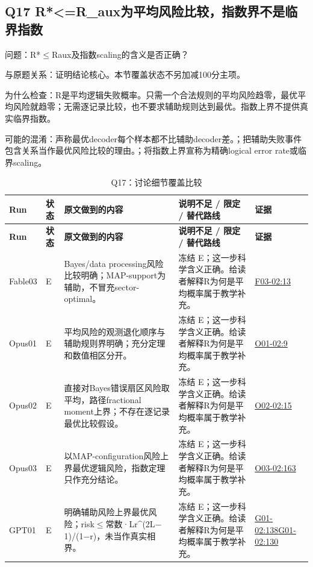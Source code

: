 \documentclass[11pt,a4paper]{article}
\begin{document}
\clearpage
\subsection{Q17 R*<=R\_aux为平均风险比较，指数界不是临界指数}
\label{aspect:Q17}
问题：R*\ensuremath{\leq}Raux及指数scaling的含义是否正确？

与原题关系：证明结论核心。本节覆盖状态不另加减100分主项。

为什么检查：R是平均逻辑失败概率。只需一个合法规则的平均风险趋零，最优平均风险就趋零；无需逐记录比较，也不要求辅助规则达到最优。指数上界不提供真实临界指数。

可能的混淆：声称最优decoder每个样本都不比辅助decoder差。；把辅助失败事件包含关系当作最优风险比较的理由。；将指数上界宣称为精确logical error rate或临界scaling。

{\fontsize{9.0}{12.6}\selectfont
\setlength{\tabcolsep}{2.5pt}
\begin{longtable}{>{\raggedright\arraybackslash}p{}>{\raggedright\arraybackslash}p{}>{\raggedright\arraybackslash}p{}>{\raggedright\arraybackslash}p{}>{\raggedright\arraybackslash}p{}}
\caption{Q17：讨论细节覆盖比较}\\
\toprule
\textbf{Run} & \textbf{状态} & \textbf{原文做到的内容} & \textbf{说明不足 / 限定 / 替代路线} & \textbf{证据}\tabularnewline
\midrule
\endfirsthead
\toprule
\textbf{Run} & \textbf{状态} & \textbf{原文做到的内容} & \textbf{说明不足 / 限定 / 替代路线} & \textbf{证据}\tabularnewline
\midrule
\endhead
{}Fable03 & E & Bayes/data processing风险比较明确；MAP-support为辅助，不冒充sector-optimal。 & 冻结 E；这一步科学含义正确。给读者解释R为何是平均概率属于教学补充。 & \hyperref[src:F03-02]{F03-02:13}\tabularnewline
{}Opus01 & E & 平均风险的观测退化顺序与辅助规则界明确；充分定理和数值相区分开。 & 冻结 E；这一步科学含义正确。给读者解释R为何是平均概率属于教学补充。 & \hyperref[src:O01-02]{O01-02:9}\tabularnewline
{}Opus02 & E & 直接对Bayes错误扇区风险取平均，路径fractional moment上界；不存在逐记录最优比较假设。 & 冻结 E；这一步科学含义正确。给读者解释R为何是平均概率属于教学补充。 & \hyperref[src:O02-02]{O02-02:15}\tabularnewline
{}Opus03 & E & 以MAP-configuration风险上界最优逻辑风险，指数定理只作充分结论。 & 冻结 E；这一步科学含义正确。给读者解释R为何是平均概率属于教学补充。 & \hyperref[src:O03-02]{O03-02:163}\tabularnewline
{}GPT01 & E & 明确辅助风险上界最优风险；risk\ensuremath{\leq}常数·Lr\textasciicircum{}(2L\ensuremath{-}1)/(1\ensuremath{-}r)，未当作真实相界。 & 冻结 E；这一步科学含义正确。给读者解释R为何是平均概率属于教学补充。 & \hyperref[src:G01-02]{G01-02:138}\newline \hyperref[src:G01-02]{G01-02:130}\tabularnewline

\end{longtable}}
\end{document}
